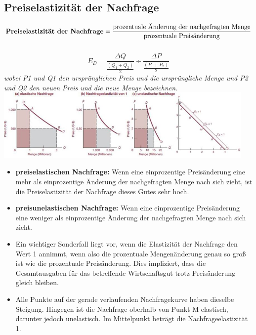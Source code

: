 \documentclass[10pt]{scrartcl}
\begin{document}
\subsection{Preiselastizität der Nachfrage}
\begin{equation}
\text{{\bf Preiselastizität der Nachfrage}} = \frac{\text{prozentuale Änderung der nachgefragten Menge}}{\text{prozentuale Preisänderung}} \nonumber
\end{equation}\\
\begin{equation}
E_{D} =  \frac{ \Delta Q }{\frac{(Q_{1} + Q_{2})}{2}} \div \frac{ \Delta P }{\frac{(P_{1} + P_{2})}{2}} \nonumber
\end{equation}
{\it wobei P1 und Q1 den ursprünglichen Preis und die ursprüngliche Menge und P2 und Q2 den neuen Preis und die neue Menge bezeichnen.}\\
\includegraphics[width=0.95\textwidth]{img/elastizitaten.jpg}
\begin{itemize}
\item {\bf preiselastischen Nachfrage:} Wenn eine einprozentige Preisänderung eine mehr als einprozentige Änderung der nachgefragten Menge nach sich zieht, ist die Preiselastizität der
Nachfrage dieses Gutes sehr hoch.
\item {\bf preisunelastischen Nachfrage:} Wenn eine einprozentige Preisänderung eine weniger als einprozentige Änderung der nachgefragten Menge nach sich zieht.
\item Ein wichtiger Sonderfall liegt vor, wenn die Elastizität der Nachfrage den Wert 1 annimmt, wenn also die prozentuale Mengenänderung genau so groß ist wie die prozentuale Preisänderung. Dies impliziert, dass die Gesamtausgaben für das betreffende Wirtschaftsgut trotz Preisänderung gleich bleiben.
\item Alle Punkte auf der gerade verlaufenden Nachfragekurve haben dieselbe Steigung. Hingegen ist die Nachfrage oberhalb von Punkt M elastisch, darunter jedoch unelastisch. Im Mittelpunkt beträgt die Nachfrageelastizität 1.
\end{itemize}
\pagebreak
\end{document}
